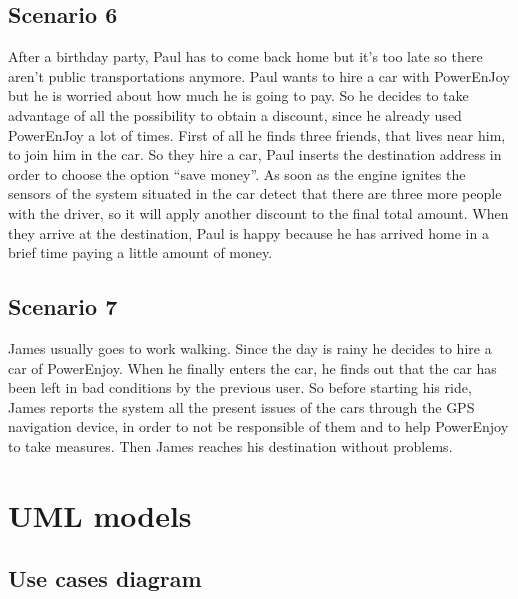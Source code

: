 \subsection{Scenario 6}
After a birthday party, Paul has to come back home but it’s too late so there aren’t public transportations anymore.
Paul wants to hire a car with PowerEnJoy but he is worried about how much he is going to pay.
So he decides to take advantage of all the possibility to obtain a discount, since he already used PowerEnJoy a lot of times.
First of all he finds three friends, that lives near him, to join him in the car.
So they hire a car, Paul inserts the destination address in order to choose the option “save money”.
As soon as the engine ignites the sensors of the system situated in the car detect that there are three more people with the driver, so it will apply another discount to the final total amount.
When they arrive at the destination, Paul is happy because he has arrived home in a brief time paying a little amount of money.

\subsection{Scenario 7}
James usually goes to work walking.
Since the day is rainy he decides to hire a car of PowerEnjoy.
When he finally enters the car, he finds out that the car has been left in bad conditions by the previous user.
So before starting his ride, James reports the system all the present issues of the cars through the GPS navigation device, in order to not be responsible of them and to help PowerEnjoy to take measures.
Then James reaches his destination without problems.

\clearpage
\section{UML models}

\subsection{Use cases diagram}
